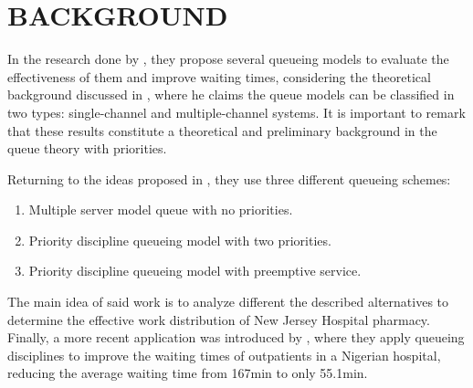 \section{BACKGROUND}
In the research done by \cite{shimshak1981priority}, they propose several queueing models to evaluate the effectiveness of them and improve waiting times, considering the theoretical background discussed in \cite{cobham1954priority}, where he claims the queue models can be classified in two types: single-channel and multiple-channel systems. It is important to remark that these results constitute a theoretical and preliminary background in the queue theory with priorities.

Returning to the ideas proposed in \cite{shimshak1981priority}, they use three different queueing schemes:
\begin{enumerate}
\item Multiple server model queue with no priorities.
\item Priority discipline queueing model with two priorities.
\item Priority discipline queueing model with preemptive service.
\end{enumerate}
The main idea of said work is to analyze different the described alternatives to determine the effective work distribution of New Jersey Hospital pharmacy. Finally, a more recent application was introduced by \cite{ndukwe2011reducing}, where they apply queueing disciplines to improve the waiting times of outpatients in a Nigerian hospital, reducing the average waiting time from 167min to only 55.1min.